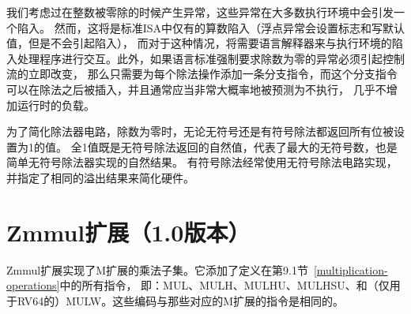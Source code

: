 \begin{commentary}

  我们考虑过在整数被零除的时候产生异常，这些异常在大多数执行环境中会引发一个陷入。
  然而，这将是标准ISA中仅有的算数陷入（浮点异常会设置标志和写默认值，但是不会引起陷入），
  而对于这种情况，将需要语言解释器来与执行环境的陷入处理程序进行交互。此外，如果语言标准强制要求除数为零的异常必须引起控制流的立即改变，
  那么只需要为每个除法操作添加一条分支指令，而这个分支指令可以在除法之后被插入，并且通常应当非常大概率地被预测为不执行，
  几乎不增加运行时的负载。

为了简化除法器电路，除数为零时，无论无符号还是有符号除法都返回所有位被设置为1的值。
全1值既是无符号除法返回的自然值，代表了最大的无符号数，也是简单无符号除法器实现的自然结果。
有符号除法经常使用无符号除法电路实现，并指定了相同的溢出结果来简化硬件。

\end{commentary}

\section{Zmmul扩展（1.0版本）}

Zmmul扩展实现了M扩展的乘法子集。它添加了定义在第9.1节~\ref{multiplication-operations}中的所有指令，
即：MUL、MULH、MULHU、MULHSU、和（仅用于RV64的）MULW。这些编码与那些对应的M扩展的指令是相同的。

